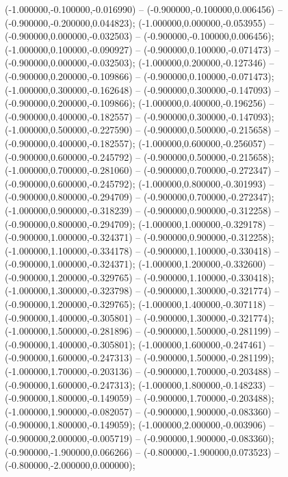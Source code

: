  (-1.000000,-0.100000,-0.016990) -- (-0.900000,-0.100000,0.006456) -- (-0.900000,-0.200000,0.044823);
 (-1.000000,0.000000,-0.053955) -- (-0.900000,0.000000,-0.032503) -- (-0.900000,-0.100000,0.006456);
 (-1.000000,0.100000,-0.090927) -- (-0.900000,0.100000,-0.071473) -- (-0.900000,0.000000,-0.032503);
 (-1.000000,0.200000,-0.127346) -- (-0.900000,0.200000,-0.109866) -- (-0.900000,0.100000,-0.071473);
 (-1.000000,0.300000,-0.162648) -- (-0.900000,0.300000,-0.147093) -- (-0.900000,0.200000,-0.109866);
 (-1.000000,0.400000,-0.196256) -- (-0.900000,0.400000,-0.182557) -- (-0.900000,0.300000,-0.147093);
 (-1.000000,0.500000,-0.227590) -- (-0.900000,0.500000,-0.215658) -- (-0.900000,0.400000,-0.182557);
 (-1.000000,0.600000,-0.256057) -- (-0.900000,0.600000,-0.245792) -- (-0.900000,0.500000,-0.215658);
 (-1.000000,0.700000,-0.281060) -- (-0.900000,0.700000,-0.272347) -- (-0.900000,0.600000,-0.245792);
 (-1.000000,0.800000,-0.301993) -- (-0.900000,0.800000,-0.294709) -- (-0.900000,0.700000,-0.272347);
 (-1.000000,0.900000,-0.318239) -- (-0.900000,0.900000,-0.312258) -- (-0.900000,0.800000,-0.294709);
 (-1.000000,1.000000,-0.329178) -- (-0.900000,1.000000,-0.324371) -- (-0.900000,0.900000,-0.312258);
 (-1.000000,1.100000,-0.334178) -- (-0.900000,1.100000,-0.330418) -- (-0.900000,1.000000,-0.324371);
 (-1.000000,1.200000,-0.332600) -- (-0.900000,1.200000,-0.329765) -- (-0.900000,1.100000,-0.330418);
 (-1.000000,1.300000,-0.323798) -- (-0.900000,1.300000,-0.321774) -- (-0.900000,1.200000,-0.329765);
 (-1.000000,1.400000,-0.307118) -- (-0.900000,1.400000,-0.305801) -- (-0.900000,1.300000,-0.321774);
 (-1.000000,1.500000,-0.281896) -- (-0.900000,1.500000,-0.281199) -- (-0.900000,1.400000,-0.305801);
 (-1.000000,1.600000,-0.247461) -- (-0.900000,1.600000,-0.247313) -- (-0.900000,1.500000,-0.281199);
 (-1.000000,1.700000,-0.203136) -- (-0.900000,1.700000,-0.203488) -- (-0.900000,1.600000,-0.247313);
 (-1.000000,1.800000,-0.148233) -- (-0.900000,1.800000,-0.149059) -- (-0.900000,1.700000,-0.203488);
 (-1.000000,1.900000,-0.082057) -- (-0.900000,1.900000,-0.083360) -- (-0.900000,1.800000,-0.149059);
 (-1.000000,2.000000,-0.003906) -- (-0.900000,2.000000,-0.005719) -- (-0.900000,1.900000,-0.083360);
 (-0.900000,-1.900000,0.066266) -- (-0.800000,-1.900000,0.073523) -- (-0.800000,-2.000000,0.000000);

